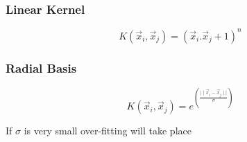 \documentclass[]{article}
\begin{document}
\subsubsection{Linear Kernel}

\begin{equation}
\label{eqn:kernel_linear}
K(\vec{x}_{i}, \vec{x}_{j}) = (\vec{x}_{i}. \vec{x}_{j} + 1) ^n
\end{equation}


\subsubsection{Radial Basis}

\begin{equation}
\label{eqn:kernel_radial}
K(\vec{x}_{i}, \vec{x}_{j}) = e^{(\frac{\mid\mid \vec{x}_{i} - \vec{x}_{j}  \mid\mid}{\sigma})}
\end{equation}

If $\sigma$ is very small over-fitting will take place
\end{document}
